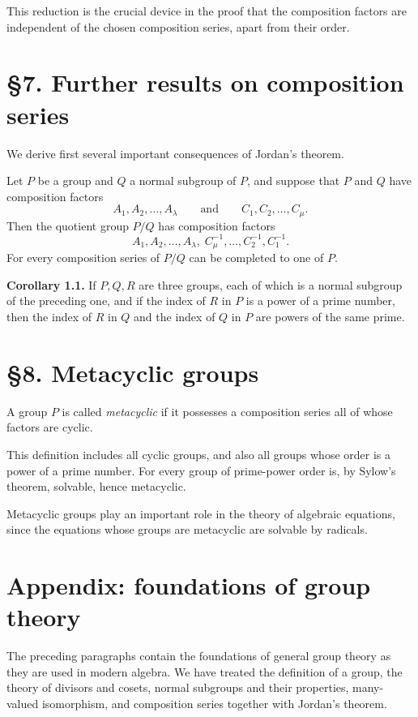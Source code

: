 \documentclass[11pt,a4paper]{book}
\begin{document}
This reduction is the crucial device in the proof that the composition factors are independent of the chosen composition series, apart from their order.

\section*{\S 7. Further results on composition series}

We derive first several important consequences of Jordan's theorem.

Let $P$ be a group and $Q$ a normal subgroup of $P$, and suppose that $P$ and $Q$ have composition factors
\[
A_1,A_2,\dots,A_\lambda
\qquad\text{and}\qquad
C_1,C_2,\dots,C_\mu.
\]
Then the quotient group $P/Q$ has composition factors
\[
A_1,A_2,\dots,A_\lambda,\; C_\mu^{-1},\dots,C_2^{-1},C_1^{-1}.
\]
For every composition series of $P/Q$ can be completed to one of $P$.

\medskip
\noindent\textbf{Corollary 1.1.}
If $P,Q,R$ are three groups, each of which is a normal subgroup of the preceding one, and if the index of $R$ in $P$ is a power of a prime number, then the index of $R$ in $Q$ and the index of $Q$ in $P$ are powers of the same prime.

\section*{\S 8. Metacyclic groups}

A group $P$ is called \emph{metacyclic} if it possesses a composition series all of whose factors are cyclic.

This definition includes all cyclic groups, and also all groups whose order is a power of a prime number. For every group of prime-power order is, by Sylow's theorem, solvable, hence metacyclic.

Metacyclic groups play an important role in the theory of algebraic equations, since the equations whose groups are metacyclic are solvable by radicals.

\section*{Appendix: foundations of group theory}

The preceding paragraphs contain the foundations of general group theory as they are used in modern algebra. We have treated the definition of a group, the theory of divisors and cosets, normal subgroups and their properties, many-valued isomorphism, and composition series together with Jordan's theorem.
\end{document}
